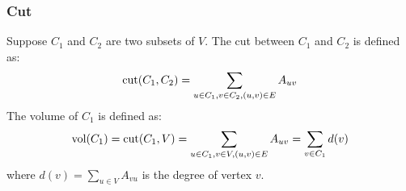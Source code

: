 \subsubsection{Cut}

Suppose $ C_1 $ and $ C_2 $ are two subsets of $ V $. 
The cut between $ C_1 $ and $ C_2 $ is defined as:
\begin{equation}
	\text{cut}(C_1, C_2) = \sum_{u \in C_1, v \in C_2, (u,v) \in E}{A_{uv}}
\end{equation}
The volume of $ C_1 $ is defined as:
\begin{equation}
	\text{vol}(C_1) = \text{cut}(C_1, V) = \sum_{u \in C_1, v \in V, (u,v) \in E}{A_{uv}}
	 = \sum_{v \in C_1}{d(v)}
\end{equation}
where $ d(v) = \sum_{u \in V}{A_{vu}} $ is the degree of vertex $ v $. 

